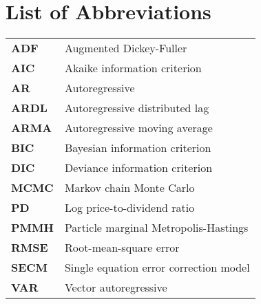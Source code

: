 \chapter{List of Abbreviations}
\begin{tabular}{ll}
\textbf{ADF} & Augmented Dickey-Fuller \\
\textbf{AIC} & Akaike information criterion \\
\textbf{AR} & Autoregressive \\
\textbf{ARDL} & Autoregressive distributed lag \\
\textbf{ARMA} & Autoregressive moving average \\
\textbf{BIC} & Bayesian information criterion \\
\textbf{DIC} & Deviance information criterion \\
\textbf{MCMC} & Markov chain Monte Carlo \\
\textbf{PD} & Log price-to-dividend ratio \\
\textbf{PMMH} & Particle marginal Metropolis-Hastings \\
\textbf{RMSE} & Root-mean-square error \\
\textbf{SECM} & Single equation error correction model \\
\textbf{VAR} & Vector autoregressive \\
\end{tabular}
